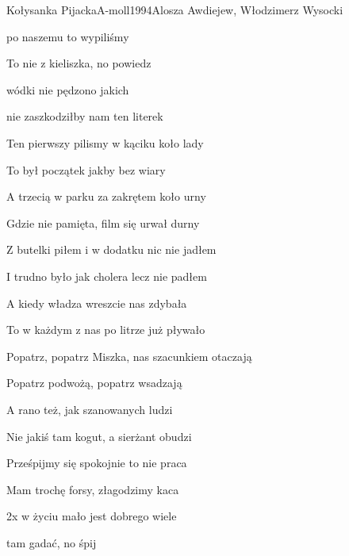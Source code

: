 \documentclass[a4paper,draft]{book}
\begin{document}
\begin{song}{Kołysanka Pijacka}{A-moll}{1994}{Alosza Awdiejew, Włodzimerz Wysocki}{}{}
	\begin{SBVerse}
	 po naszemu to wypiliśmy 

	To nie z kieliszka, no powiedz  

	 wódki nie pędzono jakich 

	 nie zaszkodziłby nam ten literek 
	\end{SBVerse}
	\begin{SBVerse}
	Ten pierwszy pilismy w kąciku koło lady

	To był początek jakby bez wiary

	A trzecią w parku za zakrętem koło urny

	Gdzie nie pamięta, film się urwał durny
	\end{SBVerse}
	\begin{SBVerse}
	Z butelki piłem i w dodatku nic nie jadłem

	I trudno było jak cholera lecz nie padłem

	A kiedy władza wreszcie nas zdybała

	To w każdym z nas po litrze już pływało
	\end{SBVerse}
	\begin{SBVerse}
	Popatrz, popatrz Miszka, nas szacunkiem otaczają

	Popatrz podwożą, popatrz wsadzają

	A rano też, jak szanowanych ludzi

	Nie jakiś tam kogut, a sierżant obudzi
	\end{SBVerse}
	\begin{SBVerse}
	Prześpijmy się spokojnie to nie praca

	Mam trochę forsy, złagodzimy kaca
	\end{SBVerse}
	\begin{SBBracket}{2x}
	 w życiu mało jest dobrego wiele 

	 tam gadać, no śpij  
	\end{SBBracket}
\end{song}
\end{document}

